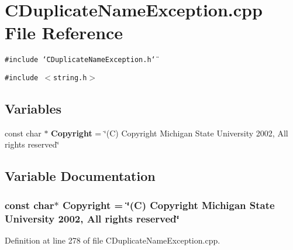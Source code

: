 \section{CDuplicate\-Name\-Exception.cpp File Reference}
\label{CDuplicateNameException_8cpp}
{\tt \#include \char`\"{}CDuplicate\-Name\-Exception.h\char`\"{}}\par
{\tt \#include $<$string.h$>$}\par
\subsection*{Variables}
\begin{CompactItemize}
\item 
const char $\ast$ {\bf Copyright} = \char`\"{}(C) Copyright Michigan State University 2002, All rights reserved\char`\"{}
\end{CompactItemize}


\subsection{Variable Documentation}
\subsubsection{\setlength{\rightskip}{0pt plus 5cm}const char$\ast$ Copyright = \char`\"{}(C) Copyright Michigan State University 2002, All rights reserved\char`\"{}\hspace{0.3cm}{\tt  [static]}}\label{CDuplicateNameException_8cpp_a0}




Definition at line 278 of file CDuplicate\-Name\-Exception.cpp.